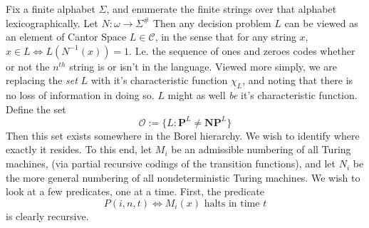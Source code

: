 \documentclass{article}
\theoremstyle{definition}
\theoremstyle{plain}
\begin{document}
\par Fix a finite alphabet $\Sigma$, and enumerate the finite strings over that alphabet lexicographically. Let $N: \omega \to \Sigma^{\#}$ Then any decision problem $L$ can be viewed as an element of Cantor Space $L \in \mathcal{C}$, in the sense that for any string $x$, $x \in L \iff L(N^{-1}(x)) = 1$. I.e. the sequence of ones and zeroes codes whether or not the $n^{th}$ string is or isn't in the language. Viewed more simply, we are replacing the \textit{set} $L$ with it's characteristic function $\chi_L$, and noting that there is no loss of information in doing so. $L$ might as well \textit{be} it's characteristic function. Define the set
\[ \mathcal{O} := \{L: \textbf{P}^L \neq \textbf{NP}^{L}\} \]
Then this set exists somewhere in the Borel hierarchy. We wish to identify where exactly it resides. To this end, let $M_i$ be an admissible numbering of all Turing machines, (via partial recursive codings of the transition functions), and let $N_i$ be the more general numbering of all nondeterministic Turing machines. We wish to look at a few predicates, one at a time. First, the predicate 
\[ P(i,n,t) \iff \textrm{$M_i(x)$ halts in time $t$} \]
is clearly recursive. 
\end{document}
